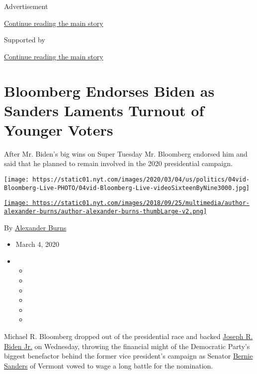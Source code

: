 Advertisement

\protect\hyperlink{after-top}{Continue reading the main story}

Supported by

\protect\hyperlink{after-sponsor}{Continue reading the main story}

\hypertarget{bloomberg-endorses-biden-as-sanders-laments-turnout-of-younger-voters}{%
\section{Bloomberg Endorses Biden as Sanders Laments Turnout of Younger
Voters}\label{bloomberg-endorses-biden-as-sanders-laments-turnout-of-younger-voters}}

After Mr. Biden's big wins on Super Tuesday Mr. Bloomberg endorsed him
and said that he planned to remain involved in the 2020 presidential
campaign.

\texttt{[image: https://static01.nyt.com/images/2020/03/04/us/politics/04vid-Bloomberg-Live-PHOTO/04vid-Bloomberg-Live-videoSixteenByNine3000.jpg]}

\href{https://www.nytimes.com/by/alexander-burns}{\texttt{[image: https://static01.nyt.com/images/2018/09/25/multimedia/author-alexander-burns/author-alexander-burns-thumbLarge-v2.png]}}

By \href{https://www.nytimes.com/by/alexander-burns}{Alexander Burns}

\begin{itemize}
\item
  March 4, 2020
\item
  \begin{itemize}
  \item
  \item
  \item
  \item
  \item
  \item
  \end{itemize}
\end{itemize}

Michael R. Bloomberg dropped out of the presidential race and backed
\href{https://www.nytimes.com/interactive/2020/us/elections/joe-biden.html}{Joseph
R. Biden Jr.} on Wednesday, throwing the financial might of the
Democratic Party's biggest benefactor behind the former vice president's
campaign as Senator
\href{https://www.nytimes.com/interactive/2020/us/elections/bernie-sanders.html}{Bernie
Sanders} of Vermont vowed to wage a long battle for the nomination.

